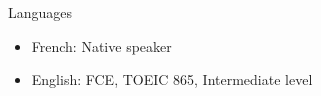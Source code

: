 \documentclass[a4paper, 10pt]{article}
\begin{document}
\begin{section} {Languages}
    \begin{languages}
	\begin{itemize}[parsep=0cm,itemsep=0cm,topsep=0cm]
	    \item French: Native speaker
	    \item English: FCE, TOEIC 865, Intermediate level
	\end{itemize}
    \end{languages}
\end{section}
\end{document}

